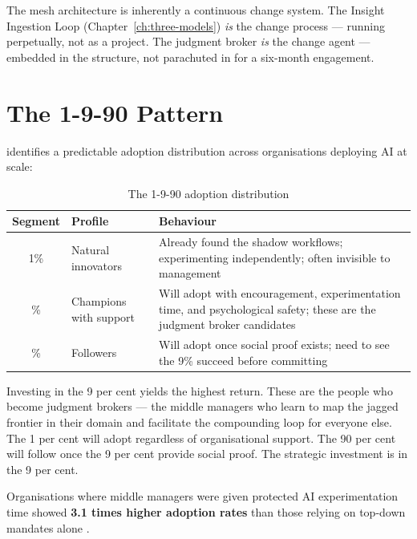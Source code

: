 \begin{keyinsight}
The mesh architecture is inherently a continuous change system. The Insight Ingestion Loop (Chapter~\ref{ch:three-models}) \emph{is} the change process --- running perpetually, not as a project. The judgment broker \emph{is} the change agent --- embedded in the structure, not parachuted in for a six-month engagement.
\end{keyinsight}

\section{The 1-9-90 Pattern}

\textcite{BCGAgenticShift2025} identifies a predictable adoption distribution across organisations deploying AI at scale:

\begin{table}[h]
\centering
\caption{The 1-9-90 adoption distribution}
\label{tab:adoption-distribution}
\begin{tabularx}{\textwidth}{c l X}
\toprule
\textbf{Segment} & \textbf{Profile} & \textbf{Behaviour} \\
\midrule
1\% & Natural innovators & Already found the shadow workflows; experimenting independently; often invisible to management \\
\addlinespace
9\% & Champions with support & Will adopt with encouragement, experimentation time, and psychological safety; these are the judgment broker candidates \\
\addlinespace
90\% & Followers & Will adopt once social proof exists; need to see the 9\% succeed before committing \\
\bottomrule
\end{tabularx}
\end{table}

Investing in the 9 per cent yields the highest return. These are the people who become judgment brokers --- the middle managers who learn to map the jagged frontier in their domain and facilitate the compounding loop for everyone else. The 1 per cent will adopt regardless of organisational support. The 90 per cent will follow once the 9 per cent provide social proof. The strategic investment is in the 9 per cent.

\begin{evidencebox}
Organisations where middle managers were given protected AI experimentation time showed \textbf{3.1 times higher adoption rates} than those relying on top-down mandates alone \parencite{BCGAIKPIs2025}.
\end{evidencebox}

